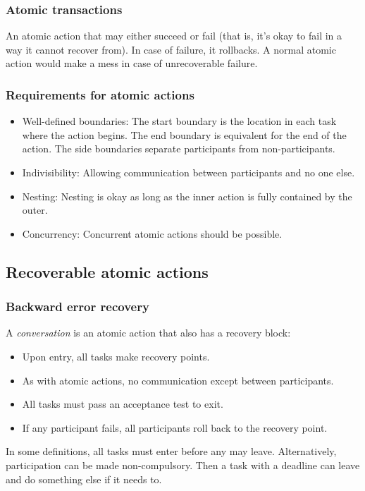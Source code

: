 \documentclass[a4paper, 12pt]{article}
\begin{document}
\subsubsection{Atomic transactions}
An atomic action that may either succeed or fail (that is, it's okay to fail in a way it cannot recover from). In case of failure, it rollbacks. A normal atomic action would make a mess in case of unrecoverable failure.

\subsubsection{Requirements for atomic actions}
\begin{itemize}
	\item Well-defined boundaries: The start boundary is the location in each task where the action begins. The end boundary is equivalent for the end of the action. The side boundaries separate participants from non-participants.
	\item Indivisibility: Allowing communication between participants and no one else.
	\item Nesting: Nesting is okay as long as the inner action is fully contained by the outer.
	\item Concurrency: Concurrent atomic actions should be possible.
\end{itemize}

\subsection{Recoverable atomic actions}
\subsubsection{Backward error recovery}
A \emph{conversation} is an atomic action that also has a recovery block:
\begin{itemize}
	\item Upon entry, all tasks make recovery points.
	\item As with atomic actions, no communication except between participants.
	\item All tasks must pass an acceptance test to exit.
	\item If any participant fails, all participants roll back to the recovery point.
\end{itemize}
In some definitions, all tasks must enter before any may leave. Alternatively, participation can be made non-compulsory. Then a task with a deadline can leave and do something else if it needs to.
\end{document}
